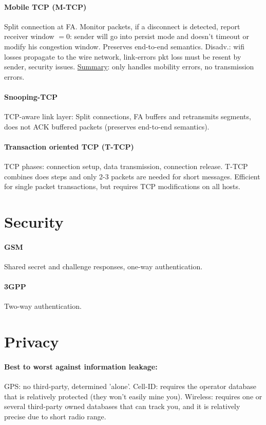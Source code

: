 \documentclass[10pt, a4paper,twocolumn]{scrartcl}
\begin{document}
\paragraph{Mobile TCP (M-TCP)} Split connection at FA. Monitor packets, if a disconnect is detected, report receiver window $= 0$: sender will go into persist mode and doesn't timeout or modify his congestion window. Preserves end-to-end semantics. Disadv.: wifi losses propagate to the wire network, link-errors pkt loss must be resent by sender, security issues. \underline{Summary}: only handles mobility errors, no transmission errors.

\paragraph{Snooping-TCP} TCP-aware link layer: Split connections, FA buffers and retransmits segments, does not ACK buffered packets (preserves end-to-end semantics).

\paragraph{Transaction oriented TCP (T-TCP)} TCP phases: connection setup, data transmission, connection release. T-TCP combines does steps and only 2-3 packets are needed for short messages. Efficient for single packet transactions, but requires TCP modifications on all hosts.

\section{Security}
\paragraph{GSM} Shared secret and challenge responses, one-way authentication.
\paragraph{3GPP} Two-way authentication.

\section{Privacy}
\paragraph{Best to worst against information leakage:}
GPS: no third-party, determined 'alone'.
Cell-ID: requires the operator database that is relatively protected (they won't easily mine you).
Wireless: requires one or several third-party owned databases that can track you, and it is relatively precise due to short radio range.
\end{document}
